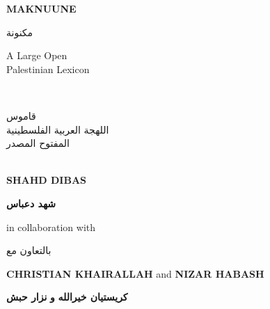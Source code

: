 \documentclass[11pt]{book}
\begin{document}
{
\centering
\vspace*{2cm}
{\par\fontsize{35}{35}\textbf{MAKNUUNE}\\}
\vspace{20pt}
{\fontsize{45}{45}\foreignlanguage{arabic}{مكنونة} \\}
\vspace*{1cm}
{\par\normalfont\fontsize{30}{30}\selectfont A Large Open \\ Palestinian Lexicon} \\ %
\vspace{1mm}
{\par\normalfont\fontsize{32}{32}\selectfont \foreignlanguage{arabic}{قاموس} \\ \foreignlanguage{arabic}{اللهجة العربية الفلسطينية} \\ \foreignlanguage{arabic}{المفتوح المصدر}} \\ %
\vspace*{2cm}
{\normalfont\fontsize{18}{18}\selectfont \textbf{SHAHD DIBAS}}\par %
\vspace{1mm}
{\normalfont\fontsize{20}{20}\selectfont \textbf{\foreignlanguage{arabic}{شهد دعباس}}}\par %

\vspace{1cm}
{\normalfont\fontsize{15}{15}\selectfont in collaboration with}\par
\vspace{1mm}
{\normalfont\fontsize{15}{15}\selectfont \foreignlanguage{arabic}{بالتعاون مع}}\par
\vspace{1cm}
}
{
{\normalfont\fontsize{12}{12}\selectfont \textbf{CHRISTIAN KHAIRALLAH}}
\hspace{1.5cm} and \hspace{2cm}
{\normalfont\fontsize{12}{12}\selectfont \textbf{NIZAR HABASH}}
\par
\hspace{2cm}
{\normalfont\fontsize{12}{12}\selectfont \textbf{\foreignlanguage{arabic}{كريستيان خيرالله}}}
\hspace{3.5cm}
{\normalfont\fontsize{12}{12}\selectfont \textbf{\foreignlanguage{arabic}{و}}}
\hspace{3.5cm}
{\normalfont\fontsize{12}{12}\selectfont \textbf{\foreignlanguage{arabic}{نزار حبش}}}

}
\end{document}
